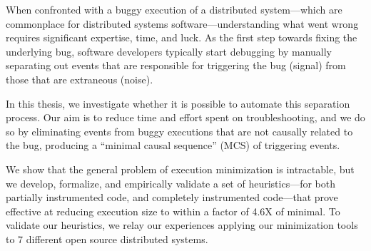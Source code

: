 
%

When confronted with a buggy execution of a distributed system---which are
commonplace for distributed
systems software---understanding what went wrong requires significant expertise, time, and luck.
As the first step towards fixing the underlying bug, software developers typically
start debugging by manually separating out events that are responsible for triggering the bug (signal) from those that are extraneous (noise).

In this thesis, we investigate whether it is possible to automate this
separation process. Our aim is to reduce time and effort spent on
troubleshooting, and we do so by eliminating
events from buggy executions that are not causally related to the bug, producing a ``minimal
causal sequence'' (MCS) of triggering events.

We show that the general problem of execution
minimization is intractable, but we develop, formalize, and
empirically validate a set of heuristics---for both partially instrumented code, and completely instrumented code---that prove effective at
reducing execution size to within a factor of 4.6X of minimal.
To validate our heuristics, we relay our experiences applying our minimization
tools to 7 different open source distributed systems.
